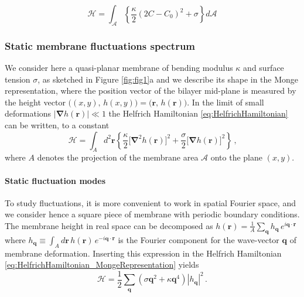 \documentclass[graybox]{svmult}
\begin{document}
\begin{equation}
	\label{eq:HelfrichHamiltonian}
	\mathcal{H} =  \int_{\mathcal{A}}\left\lbrace \frac{\kappa}{2}(2C-C_0)^2 + \sigma \right\rbrace d\mathcal{A}
\end{equation}

		\subsubsection{Static membrane fluctuations spectrum}
	We consider here a quasi-planar membrane of bending modulus $\kappa$ and surface tension $\sigma$, as sketched in Figure \ref{fig:fig1}a and we describe its shape in the Monge representation, where the position vector of the bilayer mid-plane is measured by the height vector $\big((x,y),\,h(x,y)\big) = \big(\mathbf{r},\,h(\mathbf{r})\big)$. In the limit of small deformations $\big| \boldsymbol{\nabla}h(\mathbf{r})\big| \ll 1$ the Helfrich Hamiltonian \eqref{eq:HelfrichHamiltonian} can be written, to a constant
\begin{equation}
	\label{eq:HelfrichHamiltonian_MongeRepresentation}
	\mathcal{H} = \int_A d^2\mathbf{r}\left\lbrace\frac{\kappa}{2}\big[\boldsymbol{\nabla}^2{h}(\mathbf{r})\big]^2 + \frac{\sigma}{2}\big[\boldsymbol{\nabla}h(\mathbf{r})\big]^2\right\rbrace
	\,\textrm{,}
\end{equation}
where $A$ denotes the projection of the membrane area $\mathcal{A}$ onto the plane $(x,y)$.

			\paragraph{\textbf{Static fluctuation modes}}
		To study fluctuations, it is more convenient to work in spatial Fourier space, and we consider hence a square piece of membrane with periodic boundary conditions. The membrane height in real space can be decomposed as $h(\mathbf{r}) = \frac{1}{A}\sum_{\mathbf{q}} h_{\mathbf{q}}\,e^{i\mathbf{q}\cdot\mathbf{r}}$ where $h_\mathbf{q} \equiv \int_Ad\mathbf{r}\,h(\mathbf{r})\,e^{-i\mathbf{q}\cdot\mathbf{r}}$ is the Fourier component for the wave-vector $\mathbf{q}$ of membrane deformation. Inserting this expression in the Helfrich Hamiltonian \eqref{eq:HelfrichHamiltonian_MongeRepresentation} yields
\begin{equation}
	\label{eq:HelfrichHamiltonian_FourierSpace}
	\mathcal{H} = \frac{1}{2}\sum_{\mathbf{q}}\left(\sigma \mathbf{q}^2 + \kappa \mathbf{q}^4\right)|h_{\mathbf{q}}|^2
	\,\textrm{.}
\end{equation}
	  
\end{document}
